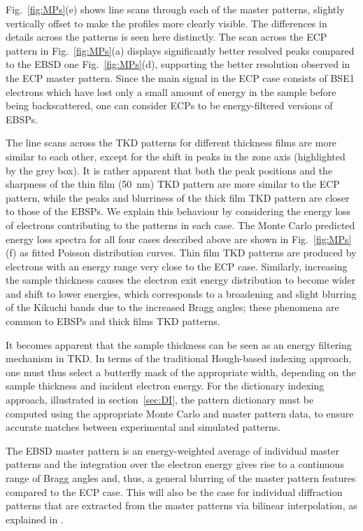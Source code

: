 Fig.~\ref{fig:MPs}(e) shows line scans through each of the master patterns, slightly vertically offset to make the profiles more clearly visible. The differences in details across the patterns is seen here distinctly. The scan across the ECP pattern in Fig.~\ref{fig:MPs}(a) displays significantly better resolved peaks compared to the EBSD one Fig.~\ref{fig:MPs}(d), supporting the better resolution observed in the ECP master pattern. Since the main signal in the ECP case consists of BSE1 electrons which have lost only a small amount of energy in the sample before being backscattered, one can consider ECPs to be energy-filtered versions of EBSPs.


The line scans across the TKD patterns for different thickness films are more similar to each other, except for the shift in peaks in the zone axis (highlighted by the grey box). It is rather apparent that both the peak positions and the sharpness of the thin film (50~nm) TKD pattern are more similar to the ECP pattern, while the peaks and blurriness of the thick film TKD pattern are closer to those of the EBSPs. We explain this behaviour by considering the energy loss of electrons contributing to the patterns in each case. The Monte Carlo predicted energy loss spectra for all four cases described above are shown in Fig.~\ref{fig:MPs}(f) as fitted Poisson distribution curves. Thin film TKD patterns are produced by electrons with an energy range very close to the ECP case. Similarly, increasing the sample thickness causes the electron exit energy distribution to become wider and shift to lower energies, which corresponds to a broadening and slight blurring of the Kikuchi bands due to the increased Bragg angles; these phenomena are common to EBSPs and thick films TKD patterns. 


It becomes apparent that the sample thickness can be seen as an energy filtering mechanism in TKD. In terms of the traditional Hough-based indexing approach, one must thus select a butterfly mask of the appropriate width, depending on the sample thickness and incident electron energy. For the dictionary indexing approach, illustrated in section~\ref{sec:DI}, the pattern dictionary must be computed using the appropriate Monte Carlo and master pattern data, to ensure accurate matches between experimental and simulated patterns.



The EBSD master pattern is an energy-weighted average of individual master patterns and the integration over the electron energy gives rise to a continuous range of Bragg angles and, thus, a general blurring of the master pattern features compared to the ECP case. This will also be the case for individual diffraction patterns that are extracted from the master patterns via bilinear interpolation, as explained in \cite{degraef2013e}.

